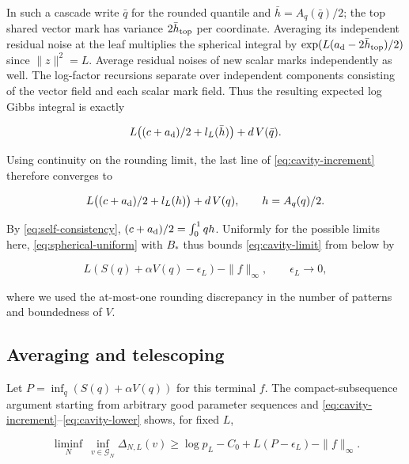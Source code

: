 \documentclass[11pt]{article}
\begin{document}
In such a cascade write $\bar q$ for the rounded quantile and $\bar h=A_q(\bar q)/2$; the top shared vector mark has variance $2\bar h_{\rm top}$ per coordinate. Averaging its independent residual noise at the leaf multiplies the spherical integral by $\exp(L(a_{\rm d}-2\bar h_{\rm top})/2)$ since $\|z\|^2=L$. Average residual noises of new scalar marks independently as well. The log-factor recursions separate over independent components consisting of the vector field and each scalar mark field. Thus the resulting expected log Gibbs integral is exactly

\begin{equation*}
L\big((c+a_{\rm d})/2+l_L(\bar h)\big)+d\,V(\bar q).
\end{equation*}

Using continuity on the rounding limit, the last line of \eqref{eq:cavity-increment} therefore converges to

\begin{equation}\label{eq:cavity-limit}
L\big((c+a_{\rm d})/2+l_L(h)\big)+d\,V(q),\qquad h=A_q(q)/2.
\end{equation}

By \eqref{eq:self-consistency}, $(c+a_{\rm d})/2=\int_0^1 qh$. Uniformly for the possible limits here, \eqref{eq:spherical-uniform} with $B_*$ thus bounds \eqref{eq:cavity-limit} from below by

\begin{equation}\label{eq:cavity-lower}
L\left(S(q)+\alpha V(q)-\epsilon_L\right)-\|f\|_\infty ,
 \qquad \epsilon_L\longrightarrow0,
\end{equation}

where we used the at-most-one rounding discrepancy in the number of patterns and boundedness of $V$.

\subsection{Averaging and telescoping}

Let $P=\inf_q(S(q)+\alpha V(q))$ for this terminal $f$. The compact-subsequence argument starting from arbitrary good parameter sequences and \eqref{eq:cavity-increment}--\eqref{eq:cavity-lower} shows, for fixed $L$,

\begin{equation*}
\liminf_N\ \inf_{v\in\mathcal G_N}\Delta_{N,L}(v)
 \ge \log p_L-C_0+L(P-\epsilon_L)-\|f\|_\infty.
\end{equation*}
\end{document}
